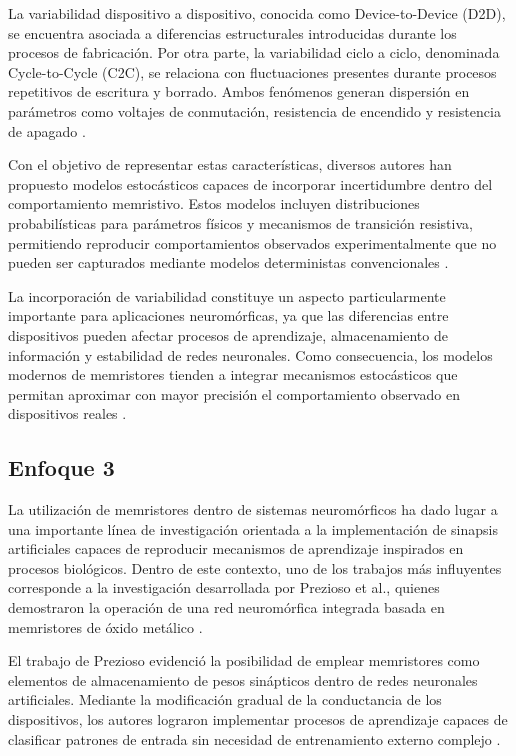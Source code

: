La variabilidad dispositivo a dispositivo, conocida como Device-to-Device (D2D), se encuentra asociada a diferencias estructurales introducidas durante los procesos de fabricación. Por otra parte, la variabilidad ciclo a ciclo, denominada Cycle-to-Cycle (C2C), se relaciona con fluctuaciones presentes durante procesos repetitivos de escritura y borrado. Ambos fenómenos generan dispersión en parámetros como voltajes de conmutación, resistencia de encendido y resistencia de apagado \cite{29}.

Con el objetivo de representar estas características, diversos autores han propuesto modelos estocásticos capaces de incorporar incertidumbre dentro del comportamiento memristivo. Estos modelos incluyen distribuciones probabilísticas para parámetros físicos y mecanismos de transición resistiva, permitiendo reproducir comportamientos observados experimentalmente que no pueden ser capturados mediante modelos deterministas convencionales \cite{27,8}.

La incorporación de variabilidad constituye un aspecto particularmente importante para aplicaciones neuromórficas, ya que las diferencias entre dispositivos pueden afectar procesos de aprendizaje, almacenamiento de información y estabilidad de redes neuronales. Como consecuencia, los modelos modernos de memristores tienden a integrar mecanismos estocásticos que permitan aproximar con mayor precisión el comportamiento observado en dispositivos reales \cite{21,29}.

\subsection{Enfoque 3}

La utilización de memristores dentro de sistemas neuromórficos ha dado lugar a una importante línea de investigación orientada a la implementación de sinapsis artificiales capaces de reproducir mecanismos de aprendizaje inspirados en procesos biológicos. Dentro de este contexto, uno de los trabajos más influyentes corresponde a la investigación desarrollada por Prezioso et al., quienes demostraron la operación de una red neuromórfica integrada basada en memristores de óxido metálico \cite{3}.

El trabajo de Prezioso evidenció la posibilidad de emplear memristores como elementos de almacenamiento de pesos sinápticos dentro de redes neuronales artificiales. Mediante la modificación gradual de la conductancia de los dispositivos, los autores lograron implementar procesos de aprendizaje capaces de clasificar patrones de entrada sin necesidad de entrenamiento externo complejo \cite{3}.


